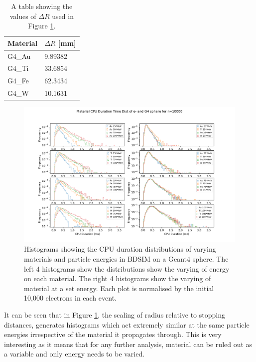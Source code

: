 \documentclass[12pt,a4paper]{article}
\begin{document}
\newpage
\begin{table}[h!]
\centering
\begin{tabular}{|l|l|}
\hline
Material & $\Delta R$ [mm] \\ \hline
G4\_Au &  9.89382\\ \hline
G4\_Ti &  33.6854\\ \hline
G4\_Fe &  62.3434\\ \hline
G4\_W &  10.1631\\ \hline
\end{tabular}
\caption{A table showing the values of $\Delta R$ used in Figure \ref{var}.}
\label{rs}
\end{table}

\begin{figure}[h!]
\centering
\includegraphics[scale=0.6]{Images//Materials//Varied_by_radius_and_secondaries.pdf}
\caption[width=\columnwidth]{Histograms showing the CPU duration distributions of varying materials and particle energies in BDSIM on a Geant4 sphere. The left 4 histograms show the distributions show the varying of energy on each material. The right 4 histograms show the varying of material at a set energy. Each plot is normalised by the initial 10,000 electrons in each event.}
\label{var}
\end{figure}

\noindent It can be seen that in Figure \ref{var}, the scaling of radius relative to stopping distances, generates histograms which act extremely similar at the same particle energies irrespective of the material it propagates through. This is very interesting as it means that for any further analysis, material can be ruled out as a variable and only energy needs to be varied.
\end{document}
